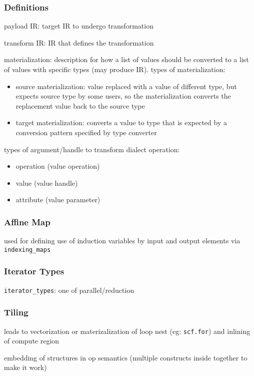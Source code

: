 \documentclass[8pt]{extarticle}
\begin{document}
\begin{multicols*}{2}
\subsubsection{Definitions}

payload IR: target IR to undergo transformation

transform IR: IR that defines the transformation

materialization: description for how a list of values should be converted to a list of values with specific types (may produce IR). types of materialization:
\begin{itemize}
\item source materialization: value replaced with a value of different type, but expects source type by some users, so the materialization converts the replacement value back to the source type
\item target materialization: converts a value to type that is expected by a conversion pattern specified by type converter
\end{itemize}

types of argument/handle to transform dialect operation:
\begin{itemize}
\item operation (value operation)
\item value (value handle)
\item attribute (value parameter)
\end{itemize}

\subsubsection{Affine Map}
used for defining use of induction variables by input and output elements via \verb|indexing_maps|

\subsubsection{Iterator Types}
\verb|iterator_types|: one of parallel/reduction

\subsubsection{Tiling}

leads to vectorization or materizalization of loop nest (eg: \verb|scf.for|) and inlining of compute region

embedding of structures in op semantics (multiple constructs inside together to make it work)


\end{multicols*}
\end{document}
